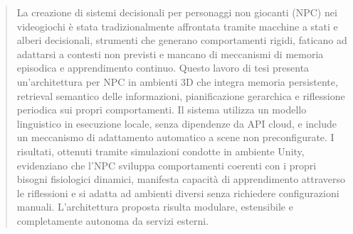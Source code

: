 \begin{titlepage}

%
\begin{abstract}
La creazione di sistemi decisionali per personaggi non giocanti (NPC) nei videogiochi è stata tradizionalmente affrontata tramite macchine a stati e alberi decisionali, strumenti che generano comportamenti rigidi, faticano ad adattarsi a contesti non previsti e mancano di meccanismi di memoria episodica e apprendimento continuo.
Questo lavoro di tesi presenta un'architettura per NPC in ambienti 3D che integra memoria persistente, retrieval semantico delle informazioni, pianificazione gerarchica e riflessione periodica sui propri comportamenti. Il sistema utilizza un modello linguistico in esecuzione locale, senza dipendenze da API cloud, e include un meccanismo di adattamento automatico a scene non preconfigurate.
I risultati, ottenuti tramite simulazioni condotte in ambiente Unity, evidenziano che l'NPC sviluppa comportamenti coerenti con i propri bisogni fisiologici dinamici, manifesta capacità di apprendimento attraverso le riflessioni e si adatta ad ambienti diversi senza richiedere configurazioni manuali. L'architettura proposta risulta modulare, estensibile e completamente autonoma da servizi esterni.
\end{abstract}
%
\\[1cm]
\end{titlepage}